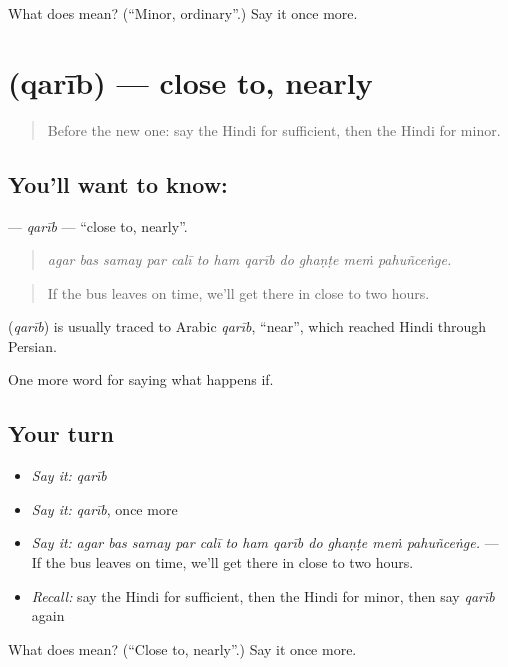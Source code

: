 \begin{tcolorbox}[breakable,colback=teal!4,colframe=teal!35!black,title={Before you move on}]
What does  mean? (\textquotedblleft{}Minor, ordinary\textquotedblright{}.) Say it once more.
\end{tcolorbox}
\section[\texorpdfstring{\hi{क़रीब} (qarīb)}{क़रीब (qarīb)}]{ (qarīb) — close to, nearly}

\label{lesson:HI-C388-qarib}



\begin{quote}
Before the new one: say the Hindi for sufficient, then the Hindi for minor.
\end{quote}

\subsection*{You'll want to know: }
\textbf{} — \emph{qarīb} — \textquotedblleft{}close to, nearly\textquotedblright{}.

\begin{quote}
           
\end{quote}

\begin{quote}
\emph{agar bas samay par calī to ham qarīb do ghaṇṭe meṁ pahuñceṅge.}
\end{quote}

\begin{quote}
If the bus leaves on time, we'll get there in close to two hours.
\end{quote}

\begin{cousinweb}
\textbf{} (\emph{qarīb}) is usually traced to Arabic \emph{qarīb}, \textquotedblleft{}near\textquotedblright{}, which reached Hindi through Persian.
\end{cousinweb}

\begin{grammarlens}[title={What you've built}]
One more word for saying what happens if.
\end{grammarlens}

\subsection*{Your turn}
\begin{itemize}
\raggedright
  \item \emph{Say it:} \emph{qarīb}
  \item \emph{Say it:} \emph{qarīb}, once more
  \item \emph{Say it:} \emph{agar bas samay par calī to ham qarīb do ghaṇṭe meṁ pahuñceṅge.} — If the bus leaves on time, we'll get there in close to two hours.
  \item \emph{Recall:} say the Hindi for sufficient, then the Hindi for minor, then say \emph{qarīb} again
\end{itemize}

\begin{tcolorbox}[breakable,colback=teal!4,colframe=teal!35!black,title={Before you move on}]
What does  mean? (\textquotedblleft{}Close to, nearly\textquotedblright{}.) Say it once more.
\end{tcolorbox}
